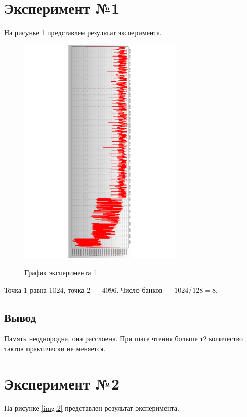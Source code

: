 \tableofcontents
\clearpage

\section{Эксперимент №1}

На рисунке \ref{img:1} представлен результат эксперимента.

\begin{figure}[H]
	\caption{График эксперимента 1}
	\includegraphics[width=0.7\textwidth, angle=90]{img/1.pdf}
	\label{img:1}
\end{figure}

Точка 1 равна 1024, точка 2 --- 4096.
Число банков --- $1024/128 = 8$.

\subsection*{Вывод}

Память неоднородна, она расслоена. При шаге чтения больше т2 количество тактов практически не меняется. 

\section{Эксперимент №2}

На рисунке \ref{img:2} представлен результат эксперимента.


